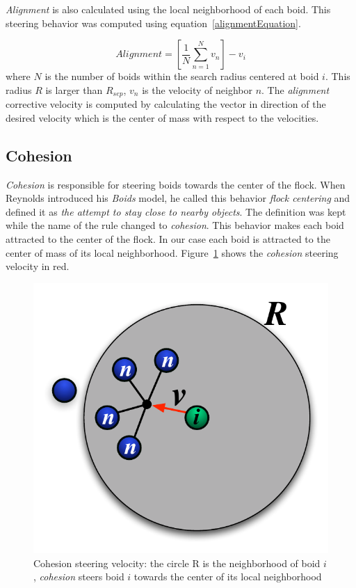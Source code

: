 \textit{Alignment} is also calculated using the local neighborhood of each boid. This steering behavior was computed using equation~\ref{alignmentEquation}.

\begin{equation}
\label{alignmentEquation}
Alignment = \left[  \frac{1}{N} \sum_{n=1}^{N} v_n \right ] - v_i
\end{equation}
where $N$ is the number of boids within the search radius centered at boid $i$. This radius $R$ is larger than $R_{sep}$, $v_n$ is the velocity of neighbor $n$. The \textit{alignment} corrective velocity is computed by calculating the vector in direction of the desired velocity which is the center of mass with respect to the velocities.

\subsection{Cohesion}
\textit{Cohesion} is responsible for steering boids towards the center of the flock. When Reynolds introduced his \textit{Boids} model, he called this behavior \textit{flock centering} and defined it as \textit{the attempt to stay close to nearby objects}. The definition was kept while the name of the rule changed to \textit{cohesion}. This behavior makes each boid attracted to the center of the flock. In our case each boid is attracted to the center of mass of its local neighborhood. Figure~\ref{cohesionPDF} shows the \textit{cohesion} steering velocity in red.

\begin{figure}[htbp]
\begin{center}
\includegraphics[scale=0.85]{figures/cohesion.pdf}
\caption{Cohesion steering velocity: the circle R is the neighborhood of boid $i$, \textit{cohesion} steers boid $i$ towards the center of its local neighborhood}
\label{cohesionPDF}
\end{center}
\end{figure}

